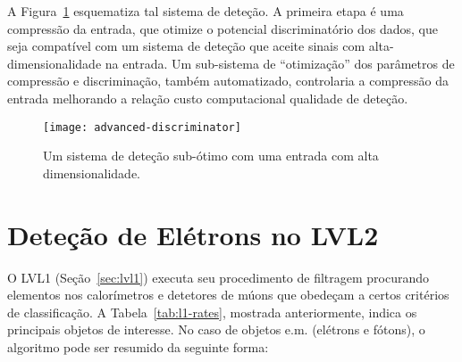 A Figura~\ref{fig:advanced-discriminator} esquematiza tal sistema de
deteção. A primeira etapa é uma compressão da entrada, que otimize o potencial
discriminatório dos dados, que seja compatível com um sistema de deteção que
aceite sinais com alta-dimensionalidade na entrada. Um sub-sistema de
``otimização'' dos parâmetros de compressão e discriminação, também
automatizado, controlaria a compressão da entrada melhorando a relação custo
computacional  qualidade de deteção.

\begin{figure}
\begin{center}
\texttt{[image: advanced-discriminator]}
\end{center}
\caption{Um sistema  de deteção sub-ótimo com uma entrada com alta
dimensionalidade.}
\label{fig:advanced-discriminator}
\end{figure}

\section{Deteção de Elétrons no LVL2}
\label{sec:lvl2-detect-electron}

O LVL1 (Seção~\ref{sec:lvl1}) executa seu procedimento de filtragem procurando
elementos nos calorímetros e detetores de múons que obedeçam a certos
critérios de classificação. A Tabela~\ref{tab:l1-rates}, mostrada
anteriormente, indica os principais objetos de interesse. No caso de objetos
e.m. (elétrons e fótons), o algoritmo pode ser resumido da seguinte forma:

